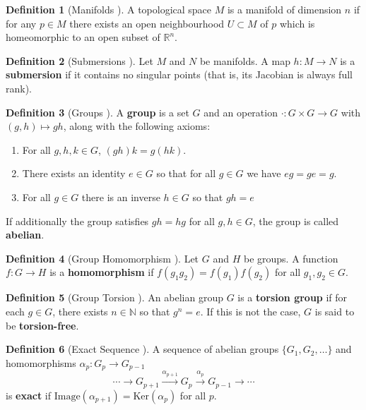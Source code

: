 \documentclass[12pt]{article}
\theoremstyle{definition}
\newtheorem{defn}{Definition}
\begin{document}
\begin{defn}[Manifolds \cite{intro-top-manifolds}]
    A topological space \(M\) is a manifold of dimension \(n\) if for any
    \(p \in M\) there exists an open neighbourhood \(U \subset M\) of \(p\)
    which is homeomorphic to an open subset of \(\mathbb{R}^n\).
\end{defn}

\begin{defn}[Submersions \cite{robots-fiber-bundles}]
    Let \(M\) and \(N\) be manifolds. A map \(h : M \rightarrow N\) is a
    \textbf{submersion} if it contains no singular points (that is, its Jacobian
    is always full rank).
\end{defn}

\begin{defn}[Groups \cite{intro-top-manifolds}]
    A \textbf{group} is a set \(G\) and an operation 
    \(\cdot : G\times G \rightarrow G\) with \((g,h) \mapsto gh\), along with
    the following axioms:
    \begin{enumerate}
        \item For all \(g,h,k \in G\), \((gh)k = g(hk)\).
        \item There exists an identity \(e \in G\) so that for all \(g \in G\)
            we have \(eg = ge = g\).
        \item For all \(g \in G\) there is an inverse \(h \in G\) so that
        \(gh = e\)
    \end{enumerate}
    If additionally the group satisfies \(gh = hg\) for all \(g,h \in G\), the
    group is called \textbf{abelian}.
\end{defn}

\begin{defn}[Group Homomorphism \cite{intro-top-manifolds}]
    Let \(G\) and \(H\) be groups. A function \(f : G \rightarrow H\) is a
    \textbf{homomorphism} if \(f(g_1g_2) = f(g_1)f(g_2)\) for all 
    \(g_1,g_2 \in G\).
\end{defn}

\begin{defn}[Group Torsion \cite{intro-top-manifolds}]
    An abelian group \(G\) is a \textbf{torsion group} if for each \(g \in G\),
    there exists \(n \in \mathbb{N}\) so that \(g^n = e\). If this is not the
    case, \(G\) is said to be \textbf{torsion-free}.
\end{defn}

\begin{defn}[Exact Sequence \cite{intro-top-manifolds}]
    A sequence of abelian groups \(\{G_1, G_2, \ldots\}\) and
    homomorphisms \(\alpha_p : G_p \rightarrow G_{p-1}\)
    \[
        \cdots \rightarrow G_{p+1} \xrightarrow{\alpha_{p+1}} G_p
    \xrightarrow{\alpha_p} G_{p-1} \rightarrow \cdots
    \]
    is \textbf{exact} if \(\text{Image}(\alpha_{p+1}) = \text{Ker}(\alpha_p)\)
    for all \(p\).
\end{defn}
\end{document}
